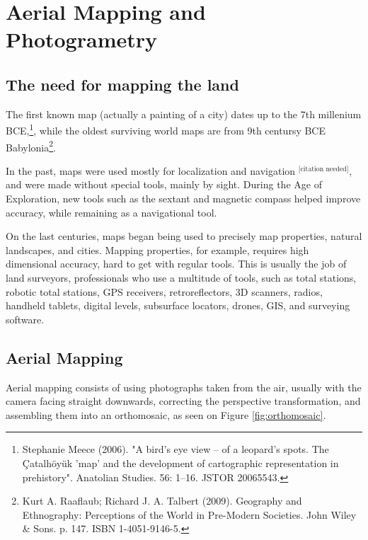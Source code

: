 

\chapter{Aerial Mapping and Photogrametry} \label{chap:AerialMapping}



\section{The need for mapping the land}
The first known map (actually a painting of a city) dates up to the 7th millenium BCE,\footnote{Stephanie Meece (2006). "A bird's eye view – of a leopard's spots. The Çatalhöyük 'map' and the development of cartographic representation in prehistory". Anatolian Studies. 56: 1–16. JSTOR 20065543.}, while the oldest surviving world maps are from 9th centursy BCE Babylonia\footnote{ Kurt A. Raaflaub; Richard J. A. Talbert (2009). Geography and Ethnography: Perceptions of the World in Pre-Modern Societies. John Wiley \& Sons. p. 147. ISBN 1-4051-9146-5.}.

In the past, maps were used mostly for localization and navigation $^{\text{[citation needed]}}$, and were made without special tools, mainly by sight. During the Age of Exploration, new tools such as the sextant and magnetic compass helped improve accuracy, while remaining as a navigational tool.

On the last centuries, maps began being used to precisely map properties, natural landscapes, and cities. Mapping properties, for example, requires high dimensional accuracy, hard to get with regular tools. This is usually the job of land surveyors, professionals who use a multitude of tools, such as total stations, robotic total stations, GPS receivers, retroreflectors, 3D scanners, radios, handheld tablets, digital levels, subsurface locators, drones, GIS, and surveying software.


\section{Aerial Mapping}
Aerial mapping consists of using photographs taken from the air, usually with the camera facing straight downwards, correcting the perspective transformation, and assembling them into an orthomosaic, as seen on Figure \ref{fig:orthomosaic}.

